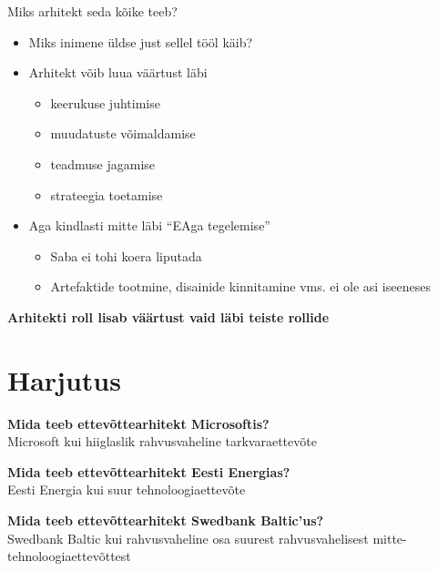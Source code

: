 \documentclass{beamer}
\begin{document}
\begin{frame}{Miks arhitekt seda kõike teeb?}
	\begin{itemize}
		\item Miks inimene üldse just sellel tööl käib?
		\item Arhitekt võib luua väärtust läbi
		\begin{itemize}
			\item keerukuse juhtimise
			\item muudatuste võimaldamise
			\item teadmuse jagamise
			\item strateegia toetamise
		\end{itemize}
		\item Aga kindlasti mitte läbi \enquote{EAga tegelemise}
		\begin{itemize}
			\item Saba ei tohi koera liputada
			\item Artefaktide tootmine, disainide kinnitamine vms. ei ole asi iseeneses
		\end{itemize}
	\end{itemize}
	\begin{center}
		\textbf{Arhitekti roll lisab väärtust vaid läbi teiste rollide}
	\end{center}
\end{frame}

\section{Harjutus}
\begin{frame}[fragile]
	\begin{center}
		\LARGE{\textbf{Mida teeb ettevõttearhitekt Microsoftis?}}
		\\[4cm]
		\small{Microsoft kui hiiglaslik rahvusvaheline tarkvaraettevõte}
	\end{center}
\end{frame}

\begin{frame}[fragile]
	\begin{center}
		\LARGE{\textbf{Mida teeb ettevõttearhitekt Eesti Energias?}}
		\\[4cm]
		\small{Eesti Energia kui suur tehnoloogiaettevõte}
	\end{center}
\end{frame}

\begin{frame}[fragile]
	\begin{center}
		\LARGE{\textbf{Mida teeb ettevõttearhitekt Swedbank Baltic'us?}}
		\\[4cm]
		\small{Swedbank Baltic kui rahvusvaheline osa suurest rahvusvahelisest mitte-tehnoloogiaettevõttest}
	\end{center}
\end{frame}
\end{document}
